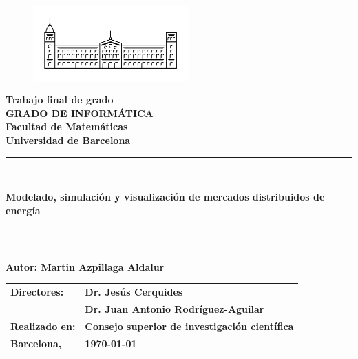 \documentclass[12pt,a4paper,openright,oneside]{article}
\numberwithin{equation}{section}
\theoremstyle{definition}
\begin{document}

\thispagestyle{empty}

\begin{titlepage}
\begin{center}
\begin{figure}[htb]
\begin{center}
\includegraphics[width=6cm]{ub.png}
\end{center}
\end{figure}

\textbf{\LARGE Trabajo final de grado} \\
\vspace*{.5cm}
\textbf{\LARGE GRADO DE INFORMÁTICA } \\
\vspace*{.5cm}
\textbf{\LARGE Facultad de Matemáticas \\ Universidad de Barcelona} \\
\vspace*{1.5cm}
\rule{16cm}{0.1mm}\\
\begin{Huge}
\textbf{Modelado, simulación y visualización de mercados distribuidos de energía} \\
\end{Huge}
\rule{16cm}{0.1mm}\\

\vspace{1cm}

\begin{flushright}
\textbf{\LARGE Autor: Martin Azpillaga Aldalur}

\vspace*{2cm}

\renewcommand{\arraystretch}{1.5}
\begin{tabular}{ll}
\textbf{\Large Directores:} & \textbf{\Large Dr. Jesús Cerquides } \\
& \textbf{\Large Dr. Juan Antonio Rodríguez-Aguilar}\\
\textbf{\Large Realizado en:} & \textbf{\Large Consejo superior de investigación científica}\\
\textbf{\Large Barcelona,} & \textbf{\Large \today }
\end{tabular}

\end{flushright}

\end{center}

\end{titlepage}
\end{document}
